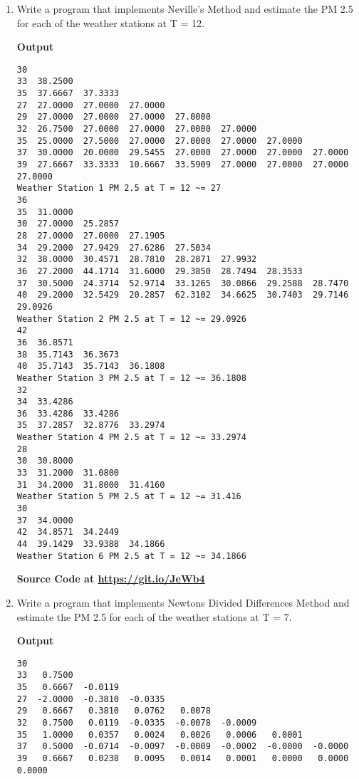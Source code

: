 \documentclass{exam}
\begin{document}
\begin{enumerate}
    \newpage
	\item  Write a program that implements Neville's Method and estimate the PM 2.5 for each of the weather stations at T = 12.
    \begin{center}
        \textbf{Output}
    \end{center}
    \begin{verbatim}
30
33  38.2500
35  37.6667  37.3333
27  27.0000  27.0000  27.0000
29  27.0000  27.0000  27.0000  27.0000
32  26.7500  27.0000  27.0000  27.0000  27.0000
35  25.0000  27.5000  27.0000  27.0000  27.0000  27.0000
37  30.0000  20.0000  29.5455  27.0000  27.0000  27.0000  27.0000
39  27.6667  33.3333  10.6667  33.5909  27.0000  27.0000  27.0000  27.0000
Weather Station 1 PM 2.5 at T = 12 ~= 27
36
35  31.0000
30  27.0000  25.2857
28  27.0000  27.0000  27.1905
34  29.2000  27.9429  27.6286  27.5034
32  38.0000  30.4571  28.7810  28.2871  27.9932
36  27.2000  44.1714  31.6000  29.3850  28.7494  28.3533
37  30.5000  24.3714  52.9714  33.1265  30.0866  29.2588  28.7470
40  29.2000  32.5429  20.2857  62.3102  34.6625  30.7403  29.7146  29.0926
Weather Station 2 PM 2.5 at T = 12 ~= 29.0926
42
36  36.8571
38  35.7143  36.3673
40  35.7143  35.7143  36.1808
Weather Station 3 PM 2.5 at T = 12 ~= 36.1808
32
34  33.4286
36  33.4286  33.4286
35  37.2857  32.8776  33.2974
Weather Station 4 PM 2.5 at T = 12 ~= 33.2974
28
30  30.8000
33  31.2000  31.0800
31  34.2000  31.8000  31.4160
Weather Station 5 PM 2.5 at T = 12 ~= 31.416
30
37  34.0000
42  34.8571  34.2449
44  39.1429  33.9388  34.1866
Weather Station 6 PM 2.5 at T = 12 ~= 34.1866
    \end{verbatim}
    \begin{center}
        \textbf{Source Code at \url{https://git.io/JeWb4}}
    \end{center}
	\newpage
	\item  Write  a  program  that  implements  Newtons  Divided  Differences  Method  and estimate the PM 2.5 for each of the weather stations at T = 7.
    \begin{center}
        \textbf{Output}
    \end{center}
    \begin{verbatim}
30
33   0.7500
35   0.6667  -0.0119
27  -2.0000  -0.3810  -0.0335
29   0.6667   0.3810   0.0762   0.0078
32   0.7500   0.0119  -0.0335  -0.0078  -0.0009
35   1.0000   0.0357   0.0024   0.0026   0.0006   0.0001
37   0.5000  -0.0714  -0.0097  -0.0009  -0.0002  -0.0000  -0.0000
39   0.6667   0.0238   0.0095   0.0014   0.0001   0.0000   0.0000   0.0000

\end{verbatim}
\end{enumerate}
\end{document}
